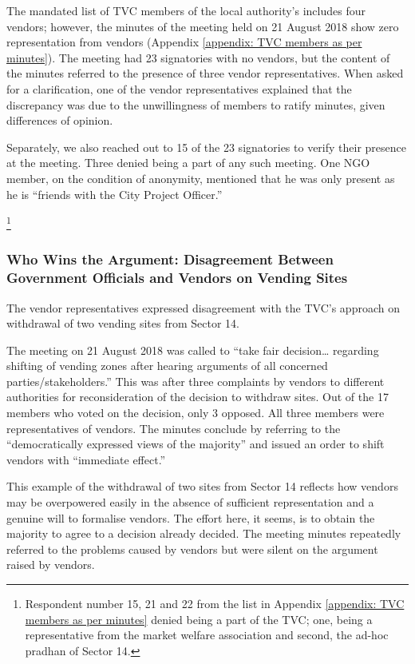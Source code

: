 \documentclass[a4paper, 12pt, twoside]{article}
\begin{document}
{The mandated list of TVC members of the local authority’s includes four vendors; however, the minutes of the meeting held on 21 August 2018 show zero representation from vendors (Appendix \ref{appendix: TVC members as per minutes}). The meeting had 23 signatories with no vendors, but the content of the minutes referred to the presence of three vendor representatives. When asked for a clarification, one of the vendor representatives explained that the discrepancy was due to the unwillingness of members to ratify minutes, given differences of opinion.

Separately, we also reached out to 15 of the 23 signatories to verify their presence at the meeting. Three denied being a part of any such meeting. One NGO member, on the condition of anonymity, mentioned that he was only present as he is “friends with the City Project Officer.”{\footnote{Respondent number 15, 21 and 22 from the list in Appendix \ref{appendix: TVC members as per minutes} denied being a part of the TVC; one, being a representative from the market welfare association and second, the ad-hoc pradhan of Sector 14.}

\subsubsection*{Who Wins the Argument: Disagreement Between Government Officials and Vendors on Vending Sites}

The vendor representatives expressed disagreement with the TVC’s approach on withdrawal of two vending sites from Sector 14.

The meeting on 21 August 2018 was called to “take fair decision… regarding shifting of vending zones after hearing arguments of all concerned parties/stakeholders.” This was after three complaints by vendors to different authorities for reconsideration of the decision to withdraw sites. Out of the 17 members who voted on the decision, only 3 opposed. All three members were representatives of vendors. The minutes conclude by referring to the “democratically expressed views of the majority” and issued an order to shift vendors with “immediate effect.”

This example of the withdrawal of two sites from Sector 14 reflects how vendors may be overpowered easily in the absence of sufficient representation and a genuine will to formalise vendors. The effort here, it seems, is to obtain the majority to agree to a decision already decided. The meeting minutes repeatedly referred to the problems caused by vendors but were silent on the argument raised by vendors.

}}
\end{document}
